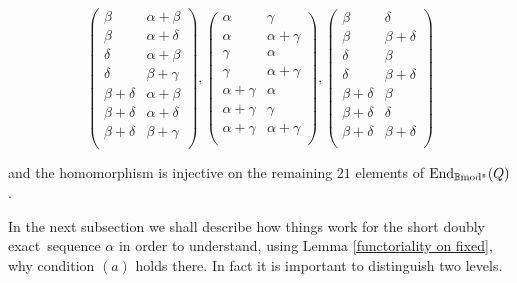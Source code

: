 \documentclass[12pt]{article}
\def\End{{\rm End}}
\def\B{{\mathbb B}}
\def\exxx{{doubly exact}~}
\def\End{{\mbox{End}}}
\def\b2{{\rm \B mod^{\mathfrak s}}}
\begin{document}
$$\left(
\begin{array}{cc}
 \beta  & \alpha +\beta  \\
 \beta  & \alpha +\delta  \\
 \delta  & \alpha +\beta  \\
 \delta  & \beta +\gamma  \\
 \beta +\delta  & \alpha +\beta  \\
 \beta +\delta  & \alpha +\delta  \\
 \beta +\delta  & \beta +\gamma  \\
\end{array}
\right),\left(
\begin{array}{cc}
 \alpha  & \gamma  \\
 \alpha  & \alpha +\gamma  \\
 \gamma  & \alpha  \\
 \gamma  & \alpha +\gamma  \\
 \alpha +\gamma  & \alpha  \\
 \alpha +\gamma  & \gamma  \\
 \alpha +\gamma  & \alpha +\gamma  \\
\end{array}
\right),\left(
\begin{array}{cc}
 \beta  & \delta  \\
 \beta  & \beta +\delta  \\
 \delta  & \beta  \\
 \delta  & \beta +\delta  \\
 \beta +\delta  & \beta  \\
 \beta +\delta  & \delta  \\
 \beta +\delta  & \beta +\delta  \\
\end{array}
\right)
$$



and the homomorphism is injective on the remaining $21$ elements of $\End_\b2(Q)$.\vspace{.05in}




In the next subsection we shall  describe  how things work for the short \exxx sequence $\alpha$ in order to understand, using Lemma \ref{functoriality on fixed}, why condition $(a)$ holds there. In fact it is important to distinguish two levels.
\end{document}
